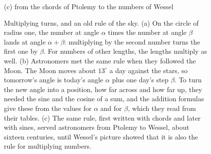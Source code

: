 \begin{figure}[tbp]
\bigskip

\smallskip
{\small (c) from the chords of Ptolemy to the numbers of Wessel\par}

\caption[Multiplying turns, and an old rule of the sky]{Multiplying turns, and an old rule of the sky. (a) On the circle of radius one, the number at angle $\alpha$ times the number at angle $\beta$ lands at angle $\alpha + \beta$: multiplying by the second number turns the first one by $\beta$. For numbers of other lengths, the lengths multiply as well. (b) Astronomers met the same rule when they followed the Moon. The Moon moves about $13^\circ$ a day against the stars, so tomorrow's angle is today's angle $\alpha$ plus one day's step $\beta$. To turn the new angle into a position, how far across and how far up, they needed the sine and the cosine of a sum, and the addition formulas give these from the values for $\alpha$ and for $\beta$, which they read from their tables. (c) The same rule, first written with chords and later with sines, served astronomers from Ptolemy to Wessel, about sixteen centuries, until Wessel's picture showed that it is also the rule for multiplying numbers.}
\label{fig:moon-rule}
\end{figure}

